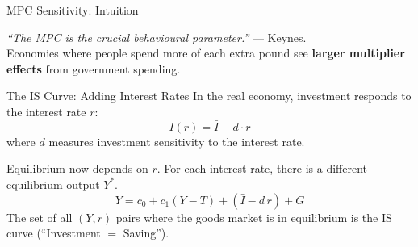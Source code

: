 \documentclass[aspectratio=169, 10pt]{beamer}
\begin{document}
\begin{frame}{MPC Sensitivity: Intuition}
\begin{center}
\end{center}
\vspace{0.3em}
\textit{``The MPC is the crucial behavioural parameter.''} --- Keynes.\\[4pt]
Economies where people spend more of each extra pound see
\textbf{larger multiplier effects} from government spending.
\end{frame}

\begin{frame}{The IS Curve: Adding Interest Rates}
In the real economy, investment responds to the interest rate $r$:
\[
  I(r) = \bar{I} - d \cdot r
\]
where $d$ measures investment sensitivity to the interest rate.
\vspace{0.5em}

Equilibrium now depends on $r$. For each interest rate, there is a
different equilibrium output $Y^*$.
\vspace{0.3em}
\[
  Y = c_0 + c_1(Y - T) + (\bar{I} - d\,r) + G
\]
\vspace{0.3em}
The set of all $(Y, r)$ pairs where the goods market is in equilibrium
is the \alert{IS curve} (``Investment $=$ Saving'').
\end{frame}
\end{document}
